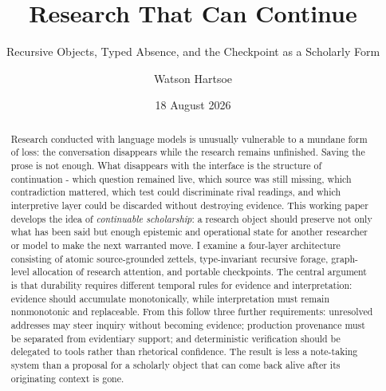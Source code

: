 \documentclass[
  11pt,
]{article}
\title{Research That Can Continue}
\subtitle{Recursive Objects, Typed Absence, and the Checkpoint as a
Scholarly Form}
\author{Watson Hartsoe}
\date{18 August 2026}
\begin{document}
\maketitle
\begin{abstract}
Research conducted with language models is unusually vulnerable to a
mundane form of loss: the conversation disappears while the research
remains unfinished. Saving the prose is not enough. What disappears with
the interface is the structure of continuation - which question remained
live, which source was still missing, which contradiction mattered,
which test could discriminate rival readings, and which interpretive
layer could be discarded without destroying evidence. This working paper
develops the idea of \emph{continuable scholarship}: a research object
should preserve not only what has been said but enough epistemic and
operational state for another researcher or model to make the next
warranted move. I examine a four-layer architecture consisting of atomic
source-grounded zettels, type-invariant recursive forage, graph-level
allocation of research attention, and portable checkpoints. The central
argument is that durability requires different temporal rules for
evidence and interpretation: evidence should accumulate monotonically,
while interpretation must remain nonmonotonic and replaceable. From this
follow three further requirements: unresolved addresses may steer
inquiry without becoming evidence; production provenance must be
separated from evidentiary support; and deterministic verification
should be delegated to tools rather than rhetorical confidence. The
result is less a note-taking system than a proposal for a scholarly
object that can come back alive after its originating context is gone.
\end{abstract}

\end{document}

